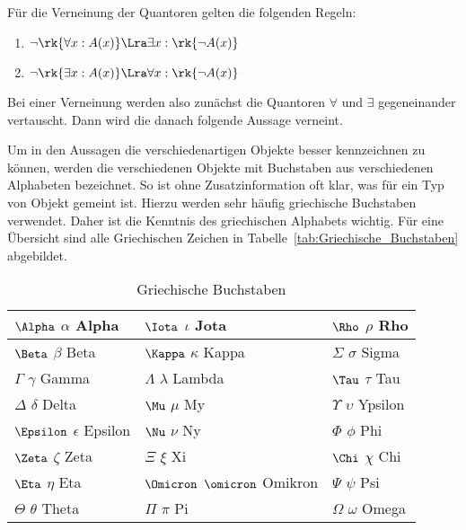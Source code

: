 Für die Verneinung der Quantoren gelten die folgenden Regeln:
\begin{enumerate}
\item $\neg \rk{\forall x : A(x)} \Lra \exists x : \rk{\neg A(x)}$
\item $\neg \rk{\exists x : A(x)} \Lra \forall x : \rk{\neg A(x)}$
\end{enumerate}

Bei einer Verneinung werden also zunächst die Quantoren $\forall$ und $\exists$ gegeneinander vertauscht. Dann wird die danach folgende Aussage verneint.

Um in den Aussagen die verschiedenartigen Objekte besser kennzeichnen zu können, werden die verschiedenen Objekte mit Buchstaben aus verschiedenen Alphabeten bezeichnet. So ist ohne Zusatzinformation oft klar, was für ein Typ von Objekt gemeint ist. Hierzu werden sehr häufig griechische Buchstaben verwendet. Daher ist die Kenntnis des griechischen Alphabets wichtig. Für eine Übersicht sind alle Griechischen Zeichen in Tabelle~\vref{tab:Griechische_Buchstaben} abgebildet.
\begin{table}[htb]
\centering
\begin{tabular}{lll}
\toprule
$\Alpha$ $\alpha$ Alpha		& $\Iota$ $\iota$ Jota		& $\Rho$ $\rho$ Rho			\\\midrule
$\Beta$ $\beta$ Beta			& $\Kappa$ $\kappa$ Kappa		& $\Sigma$ $\sigma$ Sigma		\\\midrule
$\Gamma$ $\gamma$ Gamma		& $\Lambda$ $\lambda$ Lambda		& $\Tau$ $\tau$ Tau			\\\midrule
$\Delta$ $\delta$ Delta		& $\Mu$ $\mu$ My			& $\Upsilon$ $\upsilon$ Ypsilon	\\\midrule
$\Epsilon$ $\epsilon$ Epsilon	& $\Nu$ $\nu$ Ny 			& $\Phi$ $\phi$ Phi 			\\\midrule
$\Zeta$ $\zeta$ Zeta			& $\Xi$ $\xi$ Xi			& $\Chi$ $\chi$ Chi			\\\midrule
$\Eta$ $\eta$ Eta			& $\Omicron$ $\omicron$ Omikron	& $\Psi$ $\psi$ Psi			\\\midrule
$\Theta$ $\theta$ Theta		& $\Pi$ $\pi$ Pi			& $\Omega$ $\omega$ Omega		\\\bottomrule
\end{tabular}
\label{tab:Griechische_Buchstaben}
\caption{Griechische Buchstaben}
\end{table}
